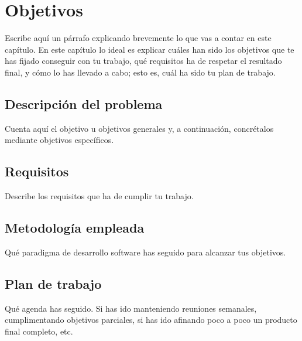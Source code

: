 \chapter{Objetivos}
\label{cap:capitulo2}


Escribe aquí un párrafo explicando brevemente lo que vas a contar en este capítulo. En este capítulo lo ideal es explicar cuáles han sido los objetivos que te has fijado conseguir con tu trabajo, qué requisitos ha de respetar el resultado final, y cómo lo has llevado a cabo; esto es, cuál ha sido tu plan de trabajo.\\

\section{Descripción del problema}
\label{sec:descripcion}

Cuenta aquí el objetivo u objetivos generales y, a continuación, concrétalos mediante objetivos específicos.

\section{Requisitos}
\label{sec:requisitos}

Describe los requisitos que ha de cumplir tu trabajo.

\section{Metodología empleada}
\label{sec:metodologia}

Qué paradigma de desarrollo software has seguido para alcanzar tus objetivos.

\section{Plan de trabajo}
\label{sec:plantrabajo}

Qué agenda has seguido. Si has ido manteniendo reuniones semanales, cumplimentando objetivos parciales, si has ido afinando poco a poco un producto final completo, etc.
